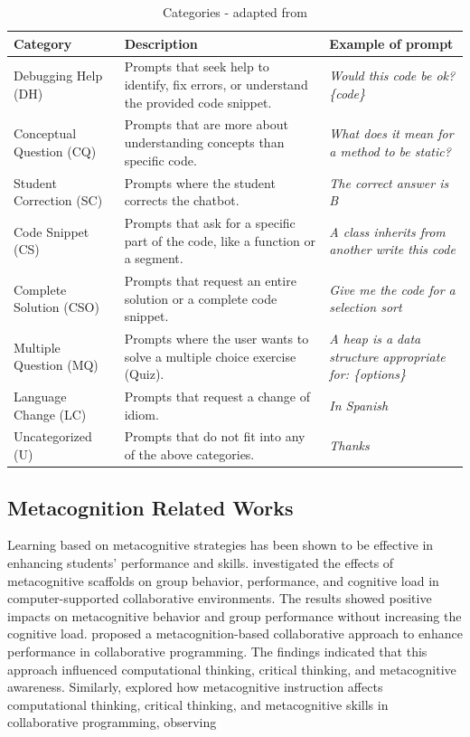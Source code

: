 \documentclass[a4paper,twoside]{article}
\begin{document}
\begin{table}[htbp]
  \caption{Categories - adapted from \cite{Ghimire24}}
  \begin{center}
    \renewcommand{\arraystretch}{1.1} %
    \begin{tabular}{p{3.8cm} p{6cm} p{4.5cm}} %
      \hline
      \textbf{Category} & \textbf{Description} & \textbf{Example of prompt} \\
      \hline
      Debugging Help (DH) & Prompts that seek help to identify, fix errors, or understand the provided code snippet. & \textit{Would this code be ok? \{code\}} \\
      Conceptual Question (CQ) & Prompts that are more about understanding concepts than specific code. & \textit{What does it mean for a method to be static?} \\
      Student Correction (SC) & Prompts where the student corrects the chatbot. & \textit{The correct answer is B} \\
      Code Snippet  (CS) & Prompts that ask for a specific part of the code, like a function or a segment. & \textit{A class inherits from another write this code} \\
      Complete Solution (CSO) & Prompts that request an entire solution or a complete code snippet. & \textit{Give me the code for a selection sort} \\
      Multiple Question (MQ) & Prompts where the user wants to solve a multiple choice exercise (Quiz). & \textit{A heap is a data structure appropriate for: \{options\}} \\
      Language Change (LC) & Prompts that request a change of idiom. & \textit{In Spanish} \\
      Uncategorized (U) & Prompts that do not fit into any of the above categories. & \textit{Thanks} \\
      \hline
    \end{tabular}
    \label{tab:categories}
  \end{center}
\end{table}

\subsection{Metacognition Related Works}

Learning based on metacognitive strategies has been shown to be effective in
enhancing students’ performance and skills. \cite{Zheng19} investigated the
effects of metacognitive scaffolds on group behavior, performance, and cognitive
load in computer-supported collaborative environments. The results showed
positive impacts on metacognitive behavior and group performance without
increasing the cognitive load. \cite{LiWei23} proposed a metacognition-based
collaborative approach to enhance performance in collaborative programming. The
findings indicated that this approach influenced computational thinking,
critical thinking, and metacognitive awareness. Similarly, \cite{Wang23}
explored how metacognitive instruction affects computational thinking, critical
thinking, and metacognitive skills in collaborative programming, observing
\end{document}
